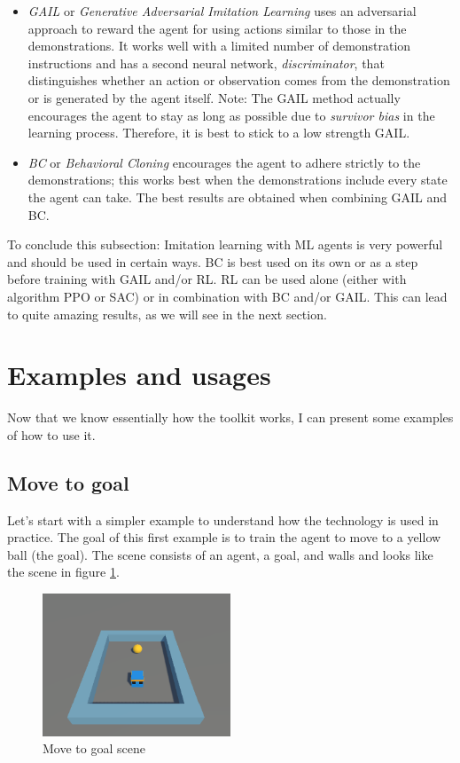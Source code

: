 \documentclass[a4paper,12pt,openright]{book}
\begin{document}
\begin{itemize} 
    \item \emph{GAIL} or \emph{Generative Adversarial Imitation Learning} \cite{GAIL} uses an adversarial approach to reward the agent for using actions similar to those in the demonstrations. It works well with a limited number of demonstration instructions and has a second neural network, \emph{discriminator}, that distinguishes whether an action or observation comes from the demonstration or is generated by the agent itself. Note: The GAIL method actually encourages the agent to stay as long as possible due to \emph{survivor bias} \cite{SurvivorBias} in the learning process. Therefore, it is best to stick to a low strength GAIL. 
    \item \emph{BC} or \emph{Behavioral Cloning} encourages the agent to adhere strictly to the demonstrations; this works best when the demonstrations include every state the agent can take. The best results are obtained when combining GAIL and BC.
\end{itemize}

To conclude this subsection: Imitation learning with ML agents is very powerful and should be used in certain ways. BC is best used on its own or as a step before training with GAIL and/or RL. RL can be used alone (either with algorithm PPO or SAC) or in combination with BC and/or GAIL. This can lead to quite amazing results, as we will see in the next section.

\section{Examples and usages}

Now that we know essentially how the toolkit works, I can present some examples of how to use it.

\subsection{Move to goal}

Let's start with a simpler example to understand how the technology is used in practice. The goal of this first example is to train the agent to move to a yellow ball (the goal). The scene consists of an agent, a goal, and walls and looks like the scene in figure \ref{pic8}.

\begin{figure}[h]
\begin{center}
\includegraphics[width=0.5\textwidth]{Images/MoveToGoal.png}
\end{center}
\caption{Move to goal scene}
\label{pic8}
\end{figure}
\end{document}
